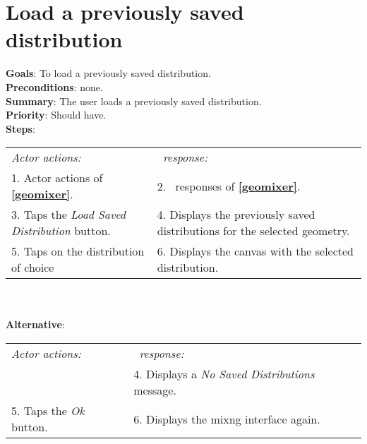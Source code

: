  \section{Load a previously saved distribution}
  \label{loadsavedist}
  \textbf{Goals}: To load a previously saved distribution.\\
  \textbf{Preconditions}: none.\\
  \textbf{Summary}: The user loads a previously saved distribution.\\
  \textbf{Priority}: Should have.\\
  \textbf{Steps}: \\
  \begin{tabular}{ p{} p{} }
  	\emph{Actor actions:} & \emph{\projectname\ response:} \\
  	1. Actor actions of \textbf{\ref{geomixer}}. & 2. \projectname\ responses of \textbf{\ref{geomixer}}. \\
	3. Taps the \emph{Load Saved Distribution} button. & 4. Displays the previously saved distributions for the selected geometry. \\
	5. Taps on the distribution of choice & 6. Displays the canvas with the selected distribution. \\
	\end{tabular}
	        \\
     \\\textbf{Alternative}: \\
    \begin{tabular}{ p{} p{} }
  	\emph{Actor actions:} & \emph{\projectname\ response:} \\
            & 4. Displays a \emph{No Saved Distributions} message. \\
    5. Taps the \emph{Ok} button. & 6. Displays the mixng interface again. \\
  \end{tabular}
  
